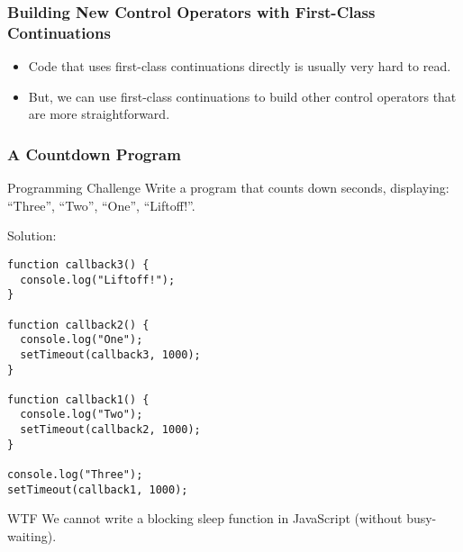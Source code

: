 \documentclass[8pt,pdf]{beamer}
\begin{document}
\begin{frame}[fragile]
\frametitle{Building New Control Operators with First-Class Continuations}

\begin{itemize}

  \item Code that uses first-class continuations directly is usually very hard
  to read.

  \item But, we can use first-class continuations to build other control
  operators that are more straightforward.

\end{itemize}

\end{frame}

\begin{frame}[fragile]
\frametitle{A Countdown Program}

\begin{block}{Programming Challenge}
Write a program that counts down seconds, displaying: ``Three'', ``Two'', ``One'', ``Liftoff!''.
\end{block}

\pause

Solution:
\begin{lstlisting}
function callback3() {
  console.log("Liftoff!");
}

function callback2() {
  console.log("One");
  setTimeout(callback3, 1000);
}

function callback1() {
  console.log("Two");
  setTimeout(callback2, 1000);
}

console.log("Three");
setTimeout(callback1, 1000);
\end{lstlisting}

\pause

\begin{alertblock}{WTF}
We cannot write a blocking sleep function in JavaScript (without busy-waiting).
\end{alertblock}

\end{frame}
\end{document}
